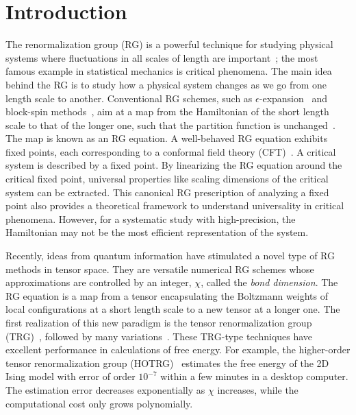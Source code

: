 \documentclass[aps,prr,reprint,superscriptaddress,floatfix]{revtex4-2}
\begin{document}
\maketitle

\section{Introduction\label{intro}}
The renormalization group (RG) is a powerful technique for studying physical systems where fluctuations in all scales of length are important~\cite{wilsonNobel}; the most famous example in statistical mechanics is critical phenomena.
The main idea behind the RG is to study how a physical system changes as we go from one length scale to another.
Conventional RG schemes, such as $\epsilon$-expansion~\cite{wilson1972} and block-spin methods~\cite{kadanoff1966,kadanoff1975,migdal,kadanoff1976,niemeijer1973}, aim at a map from the Hamiltonian of the short length scale to that of the longer one, such that the partition function is unchanged~\cite{nonlinearRG}.
The map is known as an RG equation. 
A well-behaved RG equation exhibits fixed points, each corresponding to a conformal field theory (CFT)~\cite{polchinski1988,nakayama2015}.
A critical system is described by a fixed point.
By linearizing the RG equation around the critical fixed point, universal properties like scaling dimensions of the critical system can be extracted.
This canonical RG prescription of analyzing a fixed point also provides a theoretical framework to understand universality in critical phenomena.
However, for a systematic study with high-precision, the Hamiltonian may not be the most efficient representation of the system.
%

Recently, ideas from quantum information have stimulated a novel type of RG methods in tensor space.
They are versatile numerical RG schemes whose approximations are controlled by an integer, $\chi$, called the \textit{bond dimension}.
The RG equation is a map from a tensor encapsulating the Boltzmann weights of local configurations at a short length scale to a new tensor at a longer one.
The first realization of this new paradigm is the tensor renormalization group (TRG)~\cite{trg}, followed by many variations~\cite{SRGa,SRGb,hotrg,atrg, triadtrg,morita2020global}.
These TRG-type techniques have excellent performance in calculations of free energy. 
For example, the higher-order tensor renormalization group (HOTRG)~\cite{hotrg} estimates the free energy of the 2D Ising model with error of order $10^{-7}$ within a few minutes in a desktop computer.
The estimation error decreases exponentially as $\chi$ increases, while the computational cost only grows polynomially.
%
\end{document}
